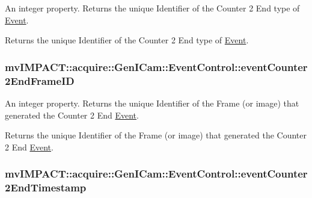 An integer property. Returns the unique Identifier of the Counter 2 End type of \hyperlink{classmv_i_m_p_a_c_t_1_1acquire_1_1_event}{Event}. 

Returns the unique Identifier of the Counter 2 End type of \hyperlink{classmv_i_m_p_a_c_t_1_1acquire_1_1_event}{Event}. \hypertarget{classmv_i_m_p_a_c_t_1_1acquire_1_1_gen_i_cam_1_1_event_control_a5399b768b8af00221a55390e143345d6}{
\subsubsection[{event\+Counter2\+End\+Frame\+I\+D}]{ mv\+I\+M\+P\+A\+C\+T\+::acquire\+::\+Gen\+I\+Cam\+::\+Event\+Control\+::event\+Counter2\+End\+Frame\+I\+D}}\label{classmv_i_m_p_a_c_t_1_1acquire_1_1_gen_i_cam_1_1_event_control_a5399b768b8af00221a55390e143345d6}


An integer property. Returns the unique Identifier of the Frame (or image) that generated the Counter 2 End \hyperlink{classmv_i_m_p_a_c_t_1_1acquire_1_1_event}{Event}. 

Returns the unique Identifier of the Frame (or image) that generated the Counter 2 End \hyperlink{classmv_i_m_p_a_c_t_1_1acquire_1_1_event}{Event}. \hypertarget{classmv_i_m_p_a_c_t_1_1acquire_1_1_gen_i_cam_1_1_event_control_afb077dd9a264f75381d84ec0fcae7b20}{
\subsubsection[{event\+Counter2\+End\+Timestamp}]{ mv\+I\+M\+P\+A\+C\+T\+::acquire\+::\+Gen\+I\+Cam\+::\+Event\+Control\+::event\+Counter2\+End\+Timestamp}}\label{classmv_i_m_p_a_c_t_1_1acquire_1_1_gen_i_cam_1_1_event_control_afb077dd9a264f75381d84ec0fcae7b20}


